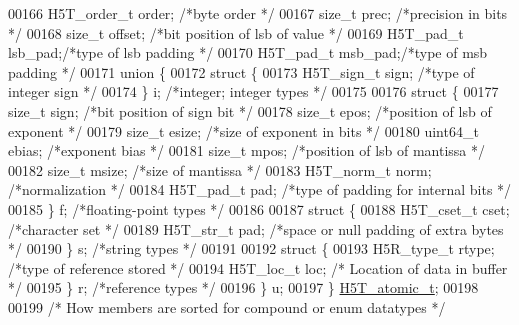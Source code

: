 \begin{DoxyCode}
00166     H5T\_order\_t     order;  \textcolor{comment}{/*byte order                     */}
00167     \textcolor{keywordtype}{size\_t}      prec;   \textcolor{comment}{/*precision in bits              */}
00168     \textcolor{keywordtype}{size\_t}      offset; \textcolor{comment}{/*bit position of lsb of value           */}
00169     H5T\_pad\_t           lsb\_pad;\textcolor{comment}{/*type of lsb padding                */}
00170     H5T\_pad\_t       msb\_pad;\textcolor{comment}{/*type of msb padding                */}
00171     \textcolor{keyword}{union }\{
00172     \textcolor{keyword}{struct }\{
00173         H5T\_sign\_t  sign;   \textcolor{comment}{/*type of integer sign               */}
00174     \} i;            \textcolor{comment}{/*integer; integer types             */}
00175 
00176     \textcolor{keyword}{struct }\{
00177         \textcolor{keywordtype}{size\_t}  sign;   \textcolor{comment}{/*bit position of sign bit           */}
00178         \textcolor{keywordtype}{size\_t}  epos;   \textcolor{comment}{/*position of lsb of exponent            */}
00179         \textcolor{keywordtype}{size\_t}  esize;  \textcolor{comment}{/*size of exponent in bits           */}
00180         uint64\_t    ebias;  \textcolor{comment}{/*exponent bias                  */}
00181         \textcolor{keywordtype}{size\_t}  mpos;   \textcolor{comment}{/*position of lsb of mantissa            */}
00182         \textcolor{keywordtype}{size\_t}  msize;  \textcolor{comment}{/*size of mantissa               */}
00183         H5T\_norm\_t  norm;   \textcolor{comment}{/*normalization                  */}
00184         H5T\_pad\_t   pad;    \textcolor{comment}{/*type of padding for internal bits      */}
00185     \} f;            \textcolor{comment}{/*floating-point types               */}
00186 
00187     \textcolor{keyword}{struct }\{
00188         H5T\_cset\_t  cset;   \textcolor{comment}{/*character set                  */}
00189         H5T\_str\_t   pad;    \textcolor{comment}{/*space or null padding of extra bytes       */}
00190     \} s;            \textcolor{comment}{/*string types                   */}
00191 
00192     \textcolor{keyword}{struct }\{
00193         H5R\_type\_t  rtype;  \textcolor{comment}{/*type of reference stored           */}
00194             H5T\_loc\_t   loc;    \textcolor{comment}{/* Location of data in buffer            */}
00195     \} r;            \textcolor{comment}{/*reference types                */}
00196     \} u;
00197 \} \hyperlink{struct_h5_t__atomic__t}{H5T\_atomic\_t};
00198 
00199 \textcolor{comment}{/* How members are sorted for compound or enum datatypes */}

\end{DoxyCode}
